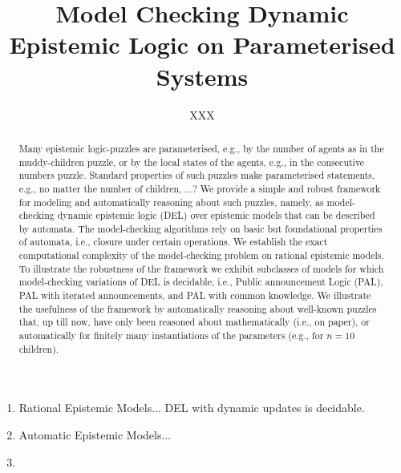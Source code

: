 \documentclass[a4paper,10pt]{article}
\title{Model Checking Dynamic Epistemic Logic on Parameterised Systems}
\author{XXX}
\begin{document}
\maketitle

\begin{abstract}
Many epistemic logic-puzzles are parameterised, e.g., by the number of agents as in the muddy-children
puzzle, or by the local states of the agents, e.g., in the consecutive numbers puzzle. Standard properties of such puzzles
make parameterised statements, e.g., no matter the number of children, ...?
We provide a simple and robust framework for modeling and automatically reasoning about such puzzles, namely, as model-checking
dynamic epistemic logic (DEL) over epistemic models that can be described by automata. The model-checking algorithms rely on basic but 
foundational properties of automata, i.e., closure under certain operations. We establish the exact computational complexity of the model-checking problem
on rational epistemic models. To illustrate the robustness of the framework we exhibit subclasses of models for which model-checking variations of DEL is decidable, i.e., Public announcement Logic (PAL), PAL with iterated announcements, and PAL with common knowledge. We illustrate the usefulness of the framework by automatically reasoning about well-known puzzles that,
up till now, have only been reasoned about mathematically (i.e., on paper), or automatically for finitely many instantiations of the parameters (e.g., for $n = 10$ children). 
\end{abstract}

\begin{enumerate}
 \item Rational Epistemic Models... DEL with dynamic updates is decidable.
 \item Automatic Epistemic Models... 
 \item 
\end{enumerate}
\end{document}
